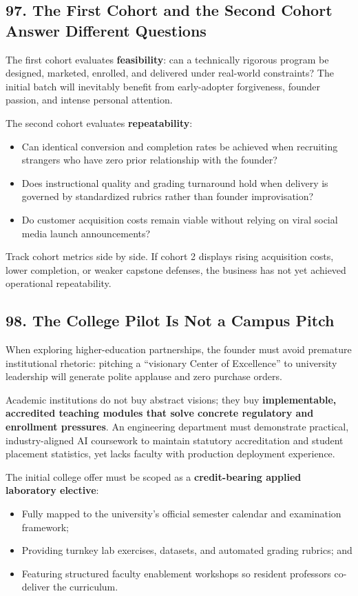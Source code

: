 \subsection*{97. The First Cohort and the Second Cohort Answer Different Questions}

The first cohort evaluates \textbf{feasibility}: can a technically rigorous program be designed, marketed, enrolled, and delivered under real-world constraints? The initial batch will inevitably benefit from early-adopter forgiveness, founder passion, and intense personal attention.

The second cohort evaluates \textbf{repeatability}:
\begin{itemize}
    \item Can identical conversion and completion rates be achieved when recruiting strangers who have zero prior relationship with the founder?
    \item Does instructional quality and grading turnaround hold when delivery is governed by standardized rubrics rather than founder improvisation?
    \item Do customer acquisition costs remain viable without relying on viral social media launch announcements?
\end{itemize}

Track cohort metrics side by side. If cohort 2 displays rising acquisition costs, lower completion, or weaker capstone defenses, the business has not yet achieved operational repeatability.

\subsection*{98. The College Pilot Is Not a Campus Pitch}

When exploring higher-education partnerships, the founder must avoid premature institutional rhetoric: pitching a ``visionary Center of Excellence'' to university leadership will generate polite applause and zero purchase orders.

Academic institutions do not buy abstract visions; they buy \textbf{implementable, accredited teaching modules that solve concrete regulatory and enrollment pressures}. An engineering department must demonstrate practical, industry-aligned AI coursework to maintain statutory accreditation and student placement statistics, yet lacks faculty with production deployment experience.

The initial college offer must be scoped as a \textbf{credit-bearing applied laboratory elective}:
\begin{itemize}
    \item Fully mapped to the university's official semester calendar and examination framework;
    \item Providing turnkey lab exercises, datasets, and automated grading rubrics; and
    \item Featuring structured faculty enablement workshops so resident professors co-deliver the curriculum.
\end{itemize}

